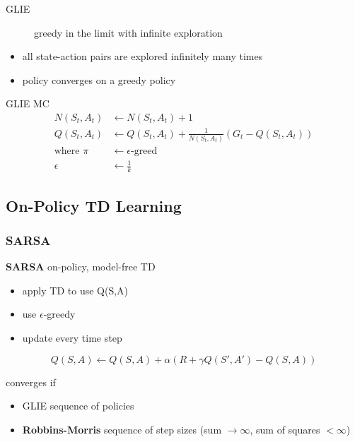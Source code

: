 \documentclass[]{article}
\theoremstyle{definition}
\begin{document}
\begin{description}
    \item[GLIE] greedy in the limit with infinite exploration
\end{description}
\begin{itemize}
    \item all state-action pairs are explored infinitely many times
    \item policy converges on a greedy policy
\end{itemize}
GLIE MC
\begin{align*}
    N(S_t, A_t) &\gets N(S_t, A_t) + 1 \\
    Q(S_t, A_t) &\gets Q(S_t, A_t) + \frac{1}{N(S_t, A_t)} (G_t - Q(S_t, A_t)) \\
    \text{where } \pi &\gets \epsilon \text{-greed} \\
    \epsilon &\gets \frac{1}{k}
\end{align*}

\subsection{On-Policy TD Learning}%
\label{sub:on_policy_td_learning}

\subsubsection{SARSA}%
\label{ssub:sarsa}
\textbf{SARSA} on-policy, model-free TD
\begin{itemize}
    \item apply TD to use Q(S,A)
    \item use $\epsilon$-greedy
    \item update every time step
\end{itemize}

\begin{equation*}
    Q(S,A) \gets Q(S,A) + \alpha (R + \gamma Q(S',A') - Q(S,A))
\end{equation*}

converges if
\begin{itemize}
    \item GLIE sequence of policies
    \item \textbf{Robbins-Morris} sequence of step sizes (sum $\to \infty$, sum of squares $< \infty$)
\end{itemize}
\end{document}
